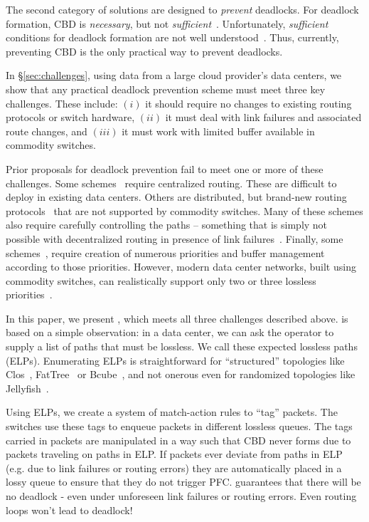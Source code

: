 The second category of solutions are designed to {\em prevent} deadlocks.  For
deadlock formation, CBD is {\em necessary}, but not {\em
sufficient}~\cite{hu2016deadlocks}. Unfortunately, {\em sufficient} conditions
for deadlock formation are not well understood~\cite{hu2016deadlocks}. Thus,
currently, preventing CBD is the only practical way to prevent deadlocks.

In \S\ref{sec:challenges}, using data from a large cloud provider's data
centers, we show that any practical deadlock prevention scheme must meet three
key challenges. These include: $(i)$ it should require no changes to existing
routing protocols or switch hardware, $(ii)$ it must deal with link failures and
associated  route changes, and $(iii)$ it must work with limited buffer
available in commodity switches.

Prior proposals for deadlock prevention fail to meet one or more of these
challenges.  Some schemes~\cite{infiniband,blazewicz1994optimal} require
centralized routing.  These are difficult to deploy in existing data centers.
Others are distributed, but brand-new routing
protocols~\cite{dally,duato93,dally93,sancho2004,flich2012survey,lash,wu2003fault,glass,duato2001,domke2011,puente1999,dfedst16,tcpbolt,dfedst16}
that are not supported by commodity switches.  Many of these schemes also
require carefully controlling the paths -- something that is simply not possible
with decentralized routing in presence of link failures~\cite{netpilot}.
Finally, some schemes~\cite{firstpaper,survey,datanetworks,karol2003prevention},
require creation of numerous priorities and buffer management according to those
priorities.  However, modern data center networks, built using commodity
switches, can realistically support only two or three lossless
priorities~\cite{rdmaatscale}.

In this paper, we present \sysname{}, which meets all three challenges described
above. \sysname{} is based on a simple observation: in a data center, we can ask
the operator to supply a list of paths that must be lossless.  We call these
expected lossless paths (ELPs). Enumerating ELPs is straightforward for
``structured'' topologies like Clos~\cite{clos}, FatTree~\cite{fattree} or
Bcube~\cite{bcube}, and not onerous even for randomized topologies like
Jellyfish~\cite{jellyfish}.

Using ELPs, we create a system of match-action rules to ``tag'' packets. The
switches use these tags to enqueue packets in different lossless queues. The
tags carried in packets are manipulated in a way such that CBD never forms due
to packets traveling on paths in ELP.  If packets ever deviate from paths in ELP
(e.g. due to link failures or routing errors) they are automatically placed in a
lossy queue to ensure that they do not trigger PFC. \sysname{} guarantees that
there will be no deadlock - even under unforeseen link failures or routing
errors. Even routing loops won't lead to deadlock!

